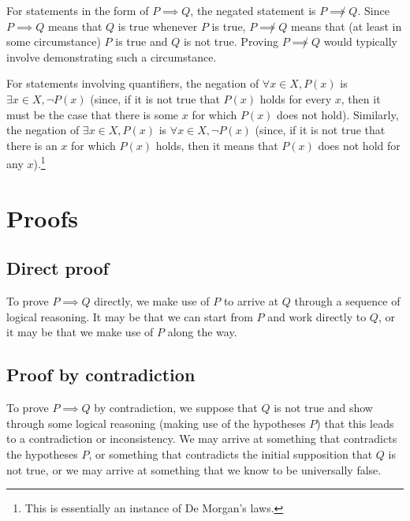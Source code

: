 For statements in the form of $P \implies Q$, the negated statement is $P \not\implies Q$. Since $P \implies Q$ means that $Q$ is true whenever $P$ is true, $P \not\implies Q$ means that (at least in some circumstance) $P$ is true and $Q$ is not true. Proving $P \not\implies Q$ would typically involve demonstrating such a circumstance.

For statements involving quantifiers, the negation of $\forall x \in X, P(x)$ is $\exists x \in X, \lnot P(x)$ (since, if it is not true that $P(x)$ holds for every $x$, then it must be the case that there is some $x$ for which $P(x)$ does not hold). Similarly, the negation of $\exists x \in X, P(x)$ is $\forall x \in X, \lnot P(x)$ (since, if it is not true that there is an $x$ for which $P(x)$ holds, then it means that $P(x)$ does not hold for any $x$).\footnote{This is essentially an instance of De Morgan's laws.}
\pagebreak

\section{Proofs}
\subsection{Direct proof}
To prove $P \implies Q$ directly, we make use of $P$ to arrive at $Q$ through a sequence of logical reasoning. It may be that we can start from $P$ and work directly to $Q$, or it may be that we make use of $P$ along the way.

\subsection{Proof by contradiction}
To prove $P \implies Q$ by contradiction, we suppose that $Q$ is not true and show through some logical reasoning (making use of the hypotheses $P$) that this leads to a contradiction or inconsistency. We may arrive at something that contradicts the hypotheses $P$, or something that contradicts the initial supposition that $Q$ is not true, or we may arrive at something that we know to be universally false.

